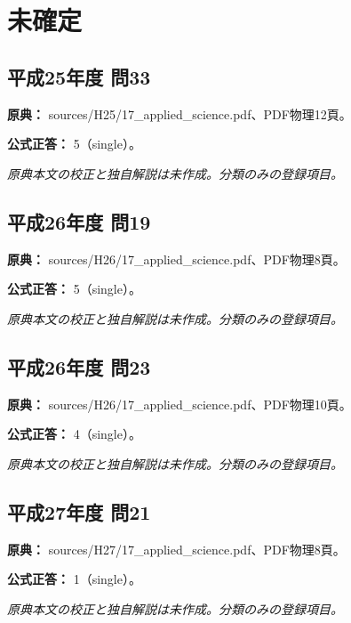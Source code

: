 \section{未確定}

\subsection{平成25年度 問33}
\label{q:h25-reg-applied-33}

\noindent\textbf{原典：} sources/H25/17\_applied\_science.pdf、PDF物理12頁。

\textbf{公式正答：} 5（single）。

\par\textit{原典本文の校正と独自解説は未作成。分類のみの登録項目。}

\subsection{平成26年度 問19}
\label{q:h26-reg-applied-19}

\noindent\textbf{原典：} sources/H26/17\_applied\_science.pdf、PDF物理8頁。

\textbf{公式正答：} 5（single）。

\par\textit{原典本文の校正と独自解説は未作成。分類のみの登録項目。}

\subsection{平成26年度 問23}
\label{q:h26-reg-applied-23}

\noindent\textbf{原典：} sources/H26/17\_applied\_science.pdf、PDF物理10頁。

\textbf{公式正答：} 4（single）。

\par\textit{原典本文の校正と独自解説は未作成。分類のみの登録項目。}

\subsection{平成27年度 問21}
\label{q:h27-reg-applied-21}

\noindent\textbf{原典：} sources/H27/17\_applied\_science.pdf、PDF物理8頁。

\textbf{公式正答：} 1（single）。

\par\textit{原典本文の校正と独自解説は未作成。分類のみの登録項目。}

